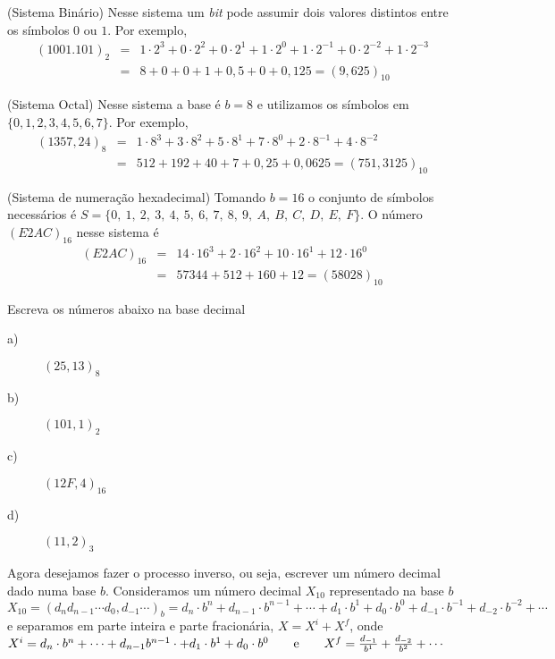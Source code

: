 \begin{ex} (Sistema Binário)
Nesse sistema um \textit{bit} pode assumir dois valores distintos entre os símbolos $0$ ou $1$. Por exemplo,
\begin{eqnarray*}
(1001.101)_{2}&=&1\cdot 2^3 +0\cdot 2^2 +0\cdot 2^1 +1\cdot 2^0  +1\cdot 2^{-1} +0\cdot 2^{-2} +1\cdot 2^{-3} \\ &=&8+0+0+1+ 0,5+0+0,125=(9,625)_{10}
\end{eqnarray*}
\end{ex}

\begin{ex} (Sistema Octal)
Nesse sistema a base é $b=8$ e utilizamos os símbolos em $\{0, 1, 2, 3, 4, 5, 6, 7\}$. Por exemplo,
\begin{eqnarray*}
(1357,24)_{8}&=&1\cdot 8^3+3\cdot 8^2+5\cdot 8^1+7\cdot 8^{0}+2\cdot 8^{-1}+4\cdot 8^{-2}\\&=&512+192+40+7+0,25+0,0625=(751,3125)_{10}
\end{eqnarray*}
\end{ex}


\begin{ex} (Sistema de numeração hexadecimal) Tomando $b=16$  o conjunto de símbolos necessários é  $S=\{0,\ 1,\ 2,\ 3,\ 4,\ 5,\ 6,\ 7,\ 8,\ 9,\ A,\ B,\ C,\ D,\ E,\ F\}$. O número $(E2AC)_{16}$ nesse sistema é
\begin{eqnarray*}
(E2AC)_{16}&=&14\cdot 16^3+2\cdot 16^2+10\cdot 16^1+12\cdot 16^{0}\\&=&57344+512+160+12=(58028)_{10}
\end{eqnarray*}
\end{ex}

\begin{prob}Escreva os números abaixo na base decimal
\begin{description}
\item[a)] $(25,13)_8$
\item[b)] $(101,1)_2$
\item[c)] $(12F,4)_{16}$
\item[d)] $(11,2)_{3}$
\end{description}
\end{prob}

Agora desejamos fazer o processo inverso, ou seja, escrever um número decimal dado numa base $b$. Consideramos um número decimal $X_{10}$ representado na base $b$
$
X_{10}=(d_nd_{n-1}\cdots d_0,d_{-1}\cdots)_{b}=d_n\cdot b^{n}+d_{n-1}\cdot b^{n-1}+\cdots +d_1\cdot b^1+d_0\cdot b^0+d_{-1}\cdot b^{-1}+d_{-2}\cdot b^{-2}+\cdots
$
e separamos em parte inteira e parte fracionária, $X=X^{i}+X^{f}$, onde
$
X^{i}=d_n\cdot b^{n}+ \cdots+d_{n-1}b^{n-1} \cdot  +d_1\cdot b^1 +d_0\cdot b^0 \qquad \hbox{e}\qquad X^{f}
= \frac{d_{-1}}{b^1}+\frac{d_{-2}}{b^{2}}+\cdots
$


